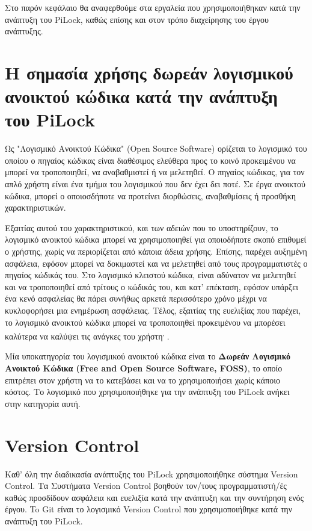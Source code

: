 Στο παρόν κεφάλαιο θα αναφερθούμε στα εργαλεία που χρησιμοποιήθηκαν κατά την ανάπτυξη του PiLock, καθώς επίσης και στον τρόπο διαχείρησης του έργου ανάπτυξης.

\section{Η σημασία χρήσης δωρεάν λογισμικού ανοικτού κώδικα κατά την ανάπτυξη του PiLock}
	Ως "Λογισμικό Ανοικτού Κώδικα" (Open Source Software) ορίζεται το λογισμικό του οποίου ο πηγαίος κώδικας είναι διαθέσιμος ελεύθερα προς το κοινό προκειμένου να μπορεί να τροποποιηθεί, να αναβαθμιστεί ή να μελετηθεί. Ο πηγαίος κώδικας, για τον απλό χρήστη είναι ένα τμήμα του λογισμικού που δεν έχει δει ποτέ. Σε έργα ανοικτού κώδικα, μπορεί ο οποιοσδήποτε να προτείνει διορθώσεις, αναβαθμίσεις ή προσθήκη χαρακτηριστικών\textsuperscript{\cite{FOSS_def}}. 

	Εξαιτίας αυτού του χαρακτηριστικού, και των αδειών που το υποστηρίζουν, το λογισμικό ανοικτού κώδικα μπορεί να χρησιμοποιηθεί για οποιοδήποτε σκοπό επιθυμεί ο χρήστης, χωρίς να περιορίζεται από κάποια άδεια χρήσης. Επίσης, παρέχει αυξημένη ασφάλεια, εφόσον μπορεί να δοκιμαστεί και να μελετηθεί από τους προγραμματιστές ο πηγαίος κώδικάς του. Στο λογισμικό κλειστού κώδικα, είναι αδύνατον να μελετηθεί και να τροποποιηθεί από τρίτους ο κώδικάς του, και κατ' επέκταση, εφόσον υπάρξει ένα κενό ασφαλείας θα πάρει συνήθως αρκετά περισσότερο χρόνο μέχρι να κυκλοφορήσει μια ενημέρωση ασφάλειας. Τέλος, εξαιτίας της ευελιξίας που παρέχει, το λογισμικό ανοικτού κώδικα μπορεί να τροποποιηθεί προκειμένου να μπορέσει καλύτερα να καλύψει τις ανάγκες του χρήστη\textsuperscript{\cite{FOSS_def}, \cite{FOSS_benefits}}.

	Μία υποκατηγορία του λογισμικού ανοικτού κώδικα είναι το \textbf{Δωρεάν Λογισμικό Ανοικτού Κώδικα (Free and Open Source Software, FOSS)}, το οποίο επιτρέπει στον χρήστη να το κατεβάσει και να το χρησιμοποιήσει χωρίς κάποιο κόστος. Το λογισμικό που χρησιμοποιήθηκε για την ανάπτυξη του PiLock ανήκει στην κατηγορία αυτή.

\section{Version Control}
	Καθ' όλη την διαδικασία ανάπτυξης του PiLock χρησιμοποιήθηκε σύστημα Version Control. Τα Συστήματα Version Control βοηθούν τον/τους προγραμματιστή/ές καθώς προσδίδουν ασφάλεια και ευελιξία κατά την ανάπτυξη και την συντήρηση ενός έργου. To Git είναι το λογισμικό Version Control που χρησιμοποιήθηκε κατά την ανάπτυξη του PiLock.

